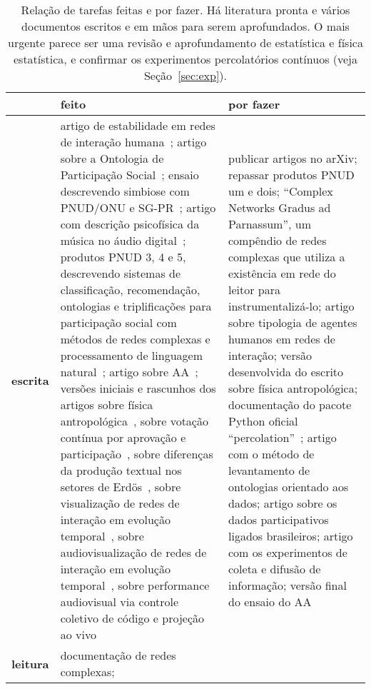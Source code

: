 \documentclass[a4paper,openright,12pt]{report} %
\begin{document}
\begin{table}[h]
\centering
\footnotesize
\caption{ \footnotesize Relação de tarefas feitas e por fazer. Há literatura pronta e vários documentos escritos e em mãos para serem aprofundados. O mais urgente parece ser uma revisão e aprofundamento de estatística
e física estatística, e confirmar os experimentos percolatórios contínuos (veja Seção~\ref{sec:exp}).}\label{tab:afa}
\begin{tabular}{p{1.3cm}||p{7.6cm}|p{7.1cm}}\hline
    & {\bf feito} & {\bf por fazer} \\\hline
    {\bf escrita}      & artigo de estabilidade em redes de interação humana~\cite{timeS};
    artigo sobre a Ontologia de Participação Social~\cite{ops};
    ensaio descrevendo simbiose com PNUD/ONU e SG-PR~\cite{ensaioAA};
    artigo com descrição psicofísica da música no áudio digital~\cite{massa};
    produtos PNUD 3, 4 e 5, descrevendo sistemas de classificação, recomendação, ontologias e triplificações para participação social com métodos de redes complexas e processamento de linguagem natural~\cite{pnud3,pnud4,pnud5};
    artigo sobre AA~\cite{paaper}; 
    versões iniciais e rascunhos dos artigos sobre física antropológica~\cite{pa},
    sobre votação contínua por aprovação e participação~\cite{vote},
    sobre diferenças da produção textual nos setores de Erdös~\cite{rcText},
    sobre visualização de redes de interação em evolução temporal~\cite{versinus},
    sobre audiovisualização de redes de interação em evolução temporal~\cite{versinus},
    sobre performance audiovisual via controle coletivo de código e projeção ao vivo~\cite{vivace}
    & publicar artigos no arXiv; repassar produtos PNUD um e dois;
    ``Complex Networks Gradus ad Parnassum'', um compêndio de redes complexas que utiliza a existência
    em rede do leitor para instrumentalizá-lo;
    artigo sobre tipologia de agentes humanos em redes de interação;
    versão desenvolvida do escrito sobre física antropológica;
    documentação do pacote Python oficial ``percolation''~\cite{percolation};
    artigo com o método de levantamento de ontologias orientado aos dados;
    artigo sobre os dados participativos ligados brasileiros;
    artigo com os experimentos de coleta e difusão de informação;
    versão final do ensaio do AA~\cite{ensaaio}\\\hline
    {\bf leitura }     & documentação de redes complexas;

\end{tabular}
\end{table}
\end{document}

